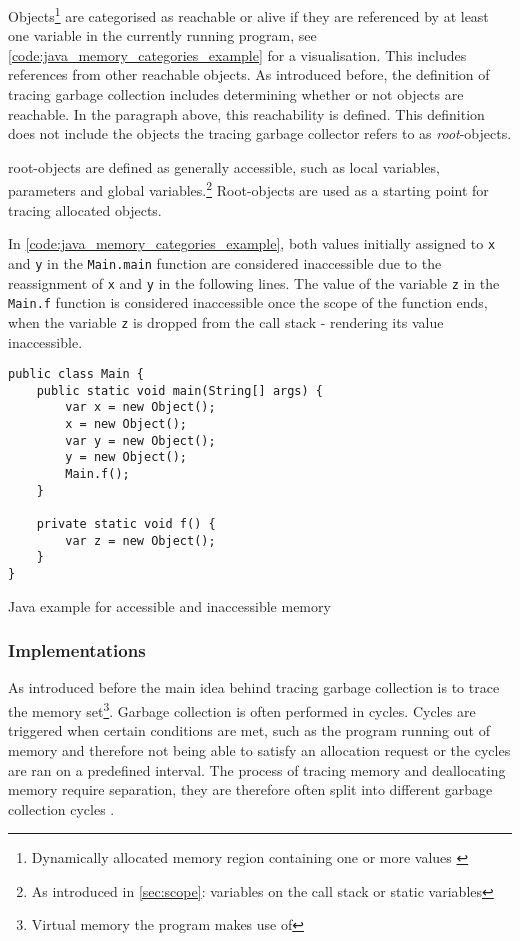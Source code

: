 Objects\footnote{Dynamically allocated memory region
containing one or more values \cite[Tracing Garbage
Collection]{go_gcguide_2022}} are categorised as reachable or alive if they are
referenced by at least one variable in the currently running program, see
\autoref{code:java_memory_categories_example} for a visualisation. This
includes references from other reachable objects. As introduced before, the
definition of tracing garbage collection includes determining whether or not
objects are reachable. In the paragraph above, this reachability is defined.
This definition does not include the objects the tracing garbage collector
refers to as \textit{root}-objects. 

root-objects are defined as generally accessible,
such as local variables, parameters and global variables.\footnote{As
introduced in \autoref{sec:scope}: variables on the call stack or static
variables} Root-objects are used as a starting point for tracing allocated
objects.

In \autoref{code:java_memory_categories_example}, both values initially
assigned to \texttt{x} and \texttt{y} in the \texttt{Main.main} function are
considered inaccessible due to the reassignment of \texttt{x} and \texttt{y}
in the following lines. The value of the variable \texttt{z} in the
\texttt{Main.f} function is considered inaccessible once the scope of the
function ends, when the variable \texttt{z} is dropped from the call stack -
rendering its value inaccessible. 

\begin{listing}[H] 
    \begin{verbatim} 
public class Main {
    public static void main(String[] args) {
        var x = new Object();
        x = new Object();
        var y = new Object();
        y = new Object();
        Main.f();
    }

    private static void f() {
        var z = new Object();
    }
}
    \end{verbatim}
    \caption{Java example for accessible and inaccessible memory}
    \label{code:java_memory_categories_example}
\end{listing}


\subsubsection{Implementations}

As introduced before the main idea behind tracing garbage collection is to
trace the memory set\footnote{Virtual memory the program makes use of}. Garbage
collection is often performed in cycles. Cycles are triggered when certain
conditions are met, such as the program running out of memory and therefore not
being able to satisfy an allocation request or the cycles are ran on a
predefined interval. The process of tracing memory and deallocating memory
require separation, they are therefore often split into different garbage
collection cycles \cite[The GC cycle]{go_gcguide_2022}.

